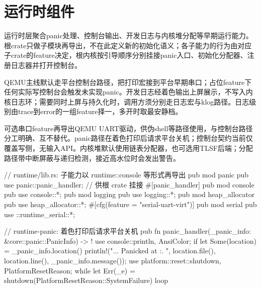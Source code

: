 
\section{运行时组件}

运行时层聚合panic处理、控制台输出、开发日志与内核堆分配等早期运行能力。根crate只做子模块再导出，不在此定义新的初始化语义；各子能力的行为由对应子crate的feature决定，根内核按引导顺序分别挂接panic入口、初始化分配器、注册日志器并打开控制台。

QEMU主线默认走平台控制台路径，把打印宏接到平台早期串口；占位feature下任何实际写控制台会触发未实现panic。开发日志经着色输出上屏展示，不写入内核日志环；需要同时上屏与持久化时，调用方须分别走日志宏与klog路径。日志级别由trace到error的一组feature择一，多开时取最安静档。

可选串口feature再导出QEMU UART驱动，供伪shell等路径使用，与控制台路径分工明确、互不替代。panic路径在着色打印后请求平台关机；控制台契约当前仅覆盖写侧，无输入API。内核堆默认使用链表分配器，也可选用TLSF后端；分配路径带中断屏蔽与递归检测，接近高水位时会发出警告。

\begin{rustcode}
// runtime/lib.rs: 子能力以 runtime::console 等形式再导出
pub mod panic {
    pub use panic::panic_handler; // 供根 crate 挂接 #[panic_handler]
}
pub mod console {
    pub use console::*;
}
pub mod logging {
    pub use logging::*;
}
pub mod heap_allocator {
    pub use heap_allocator::*;
}
#[cfg(feature = "serial-uart-virt")]
pub mod serial {
    pub use ::runtime_serial::*;
}
\end{rustcode}

\begin{rustcode}
// runtime-panic: 着色打印后请求平台关机
pub fn panic_handler(_panic_info: &core::panic::PanicInfo) -> ! {
    use console::{println, AnsiColor};
    if let Some(location) = _panic_info.location() {
        println!("... Panicked at {}:{}.  {}",
                 location.file(), location.line(), _panic_info.message());
    }
    use platform::reset::{shutdown, PlatformResetReason};
    while let Err(_e) = shutdown(PlatformResetReason::SystemFailure) {}
    loop {}
}
\end{rustcode}
